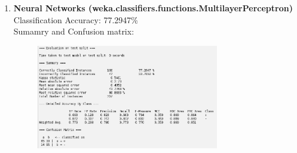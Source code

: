 \documentclass{article}
\begin{document}
\begin{enumerate}[label = (\alph*), left=10pt, itemsep=10pt]
\begin{minipage}[t]{0.9\textwidth}
\begin{figure}[H]
            \end{figure} 
        \end{minipage}
        \item \begin{minipage}[t]{0.9\textwidth}
            \textbf{Neural Networks (weka.classifiers.functions.MultilayerPerceptron)}\\
             Classification Accuracy: 77.2947\%\\
             Sumamry and Confusion matrix:
             \begin{figure}[H]
                \includegraphics[width=0.75\textwidth, height=0.25\textheight]{./7c.png}
            \end{figure}
        \end{minipage}

    \end{enumerate}
\end{document}
